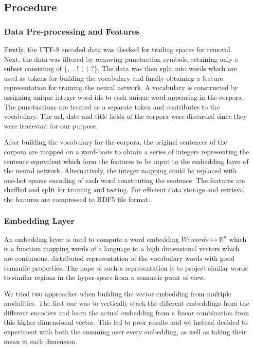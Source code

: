 \documentclass[12pt]{article}
\begin{document}
\subsection{Procedure}\label{procedure}

\subsubsection{Data Pre-processing and Features}

Firstly, the UTF-8 encoded data was checked for trailing spaces for removal. Next, the data was filtered by removing punctuation symbols, retaining only a subset consisting of \{$,$ $.$ $!$ $($ $)$ $?$\}. The data was then split into words which are used as tokens for building the vocabulary and finally obtaining a feature representation for training the neural network. A vocabulary is constructed by assigning unique integer word-ids to each unique word appearing in the corpora. The punctuations are treated as a separate token and contributes to the vocabulary. The url, date and title fields of the corpora were discarded since they were irrelevant for our purpose.  

After building the vocabulary for the corpora, the original sentences of the corpora are mapped on a word-basis to obtain a series of integers representing the sentence equivalent which form the features to be input to the embedding layer of the neural network. Alternatively, the integer mapping could be replaced with one-hot sparse encoding of each word constituting the sentence. The features are shuffled and split for training and testing. For efficient data storage and retrieval the features are compressed to HDF5 file format.

\subsubsection{Embedding Layer}
An embedding layer is used to compute a word embedding $W: words \mapsto \mathbb{R}^{n}$ which is a function mapping words of a language to a high dimensional vectors which are continuous, distributed representation of the vocabulary words with good semantic properties. The hope of such a representation is to project similar words to similar regions in the hyper-space from a semantic point of view. 

We tried two approaches when building the vector embedding from multiple modalities. The first one was to vertically stack the different embeddings from the different encoders and learn the actual embedding from a linear combination from this higher dimensional vector. This led to poor results and we instead decided to experiment with both the summing over every embedding, as well as taking their mean in each dimension.
\end{document}
